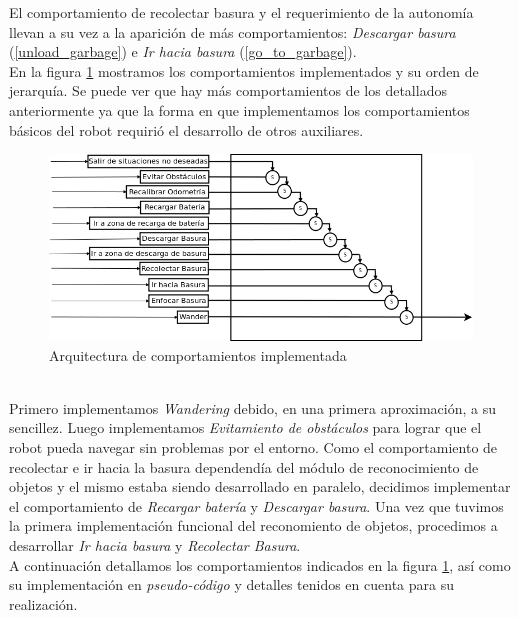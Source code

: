 El comportamiento de recolectar basura y el requerimiento de la autonom\'ia
llevan a su vez a la aparici\'on de m\'as comportamientos: \emph{Descargar
basura} (\ref{unload_garbage}) e \emph{Ir hacia basura} (\ref{go_to_garbage}).
\\\indent
En la figura \ref{fig:architecture} mostramos los comportamientos implementados
y su orden de jerarqu\'ia. Se puede ver que hay m\'as comportamientos de los
detallados anteriormente ya que la forma en que implementamos los
comportamientos b\'asicos del robot requiri\'o el desarrollo de otros
auxiliares.
\\\indent
\begin{figure}[htp]
\begin{center}
\includegraphics[scale=0.5]{comportamientos/figures/behavioursArchitecture2.png}
\caption{Arquitectura de comportamientos implementada}
\label{fig:architecture}
\end{center}
\end{figure}
\\\indent
Primero implementamos \emph{Wandering} debido, en una primera aproximaci\'on,
a su sencillez. Luego implementamos \emph{Evitamiento de obst\'aculos}
para lograr que el robot pueda navegar sin problemas por el entorno. Como el
comportamiento de recolectar e ir hacia la basura dependend\'ia del m\'odulo
de reconocimiento de objetos y el mismo estaba siendo desarrollado en paralelo,
decidimos implementar el comportamiento de \emph{Recargar bater\'ia} y
\emph{Descargar basura}. Una vez que tuvimos la primera implementaci\'on
funcional del reconomiento de objetos, procedimos a desarrollar
\emph{Ir hacia basura} y \emph{Recolectar Basura}.
\\\indent
A continuaci\'on detallamos los comportamientos indicados en la figura
\ref{fig:architecture}, as\'i como su implementaci\'on en 
\emph{pseudo-c\'odigo} y detalles tenidos en cuenta para su realizaci\'on.


